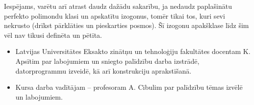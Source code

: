 \documentclass[utf8]{ludis2022}
\begin{document}
Iespējams, varētu arī atrast daudz dažādu sakarību, ja 
nedaudz paplašinātu perfekto polimondu klasi un  apskatītu izogonus, tomēr tikai tos, kuri sevi nekrusto (drīkst pārklāties un pieskarties posmos). Šī izogonu apakšklase līdz šim vēl nav tikusi definēta un pētīta.

\newpage

\clearpage
{}
\printbibliography[title=Izmantotā literatūra un avoti] 


\newpage




\begin{itemize}
    \item Latvijas Universitātes Eksakto zinātņu un tehnoloģiju fakultātes docentam K. Apsītim par labojumiem un sniegto palīdzību darba izstrādē, datorprogrammu izveidē, kā arī konstrukciju aprakstīšanā.
    \item Kursa darba vadītājam -- profesoram A. Cibulim par palīdzību tēmas izvēlē un labojumiem.
\end{itemize}






\appendix
{}
\end{document}
